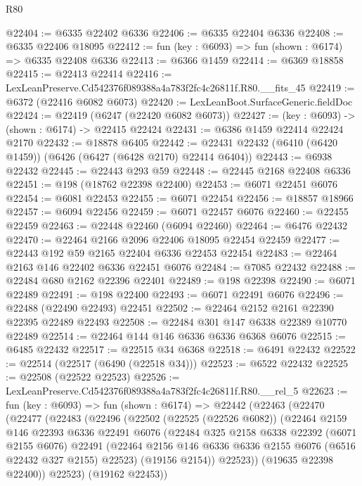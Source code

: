 \begin{lexlean}{R80}
\begin{coremodule}
@22404 := @6335 @22402 @6336
@22406 := @6335 @22404 @6336
@22408 := @6335 @22406 @18095
@22412 := fun (key : @6093) => fun (shown : @6174) => @6335 @22408 @6336
@22413 := @6366 @1459
@22414 := @6369 @18858
@22415 := @22413 @22414
@22416 := LexLeanPreserve.Cd542376f089388a4a783f2fc4c26811f.R80.__fits_45
@22419 := @6372 (@22416 @6082 @6073)
@22420 := LexLeanBoot.SurfaceGeneric.fieldDoc
@22424 := @22419 (@6247 (@22420 @6082 @6073))
@22427 := (key : @6093) -> (shown : @6174) -> @22415 @22424
@22431 := @6386 @1459 @22414 @22424 @2170
@22432 := @18878 @6405
@22442 := @22431 @22432 (@6410 (@6420 @1459)) (@6426 (@6427 (@6428 @2170) @22414 @6404))
@22443 := @6938 @22432
@22445 := @22443 @293 @59
@22448 := @22445 @2168 @22408 @6336
@22451 := @198 (@18762 @22398 @22400)
@22453 := @6071 @22451 @6076
@22454 := @6081 @22453
@22455 := @6071 @22454
@22456 := @18857 @18966
@22457 := @6094 @22456
@22459 := @6071 @22457 @6076
@22460 := @22455 @22459
@22463 := @22448 @22460 (@6094 @22460)
@22464 := @6476 @22432
@22470 := @22464 @2166 @2096 @22406 @18095 @22454 @22459
@22477 := @22443 @192 @59 @2165 @22404 @6336 @22453 @22454
@22483 := @22464 @2163 @146 @22402 @6336 @22451 @6076
@22484 := @7085 @22432
@22488 := @22484 @680 @2162 @22396 @22401
@22489 := @198 @22398
@22490 := @6071 @22489
@22491 := @198 @22400
@22493 := @6071 @22491 @6076
@22496 := @22488 (@22490 @22493) @22451
@22502 := @22464 @2152 @2161 @22390 @22395 @22489 @22493
@22508 := @22484 @301 @147 @6338 @22389 @10770 @22489
@22514 := @22464 @144 @146 @6336 @6336 @6368 @6076
@22515 := @6485 @22432
@22517 := @22515 @34 @6368
@22518 := @6491 @22432
@22522 := @22514 (@22517 (@6490 (@22518 @34)))
@22523 := @6522 @22432
@22525 := @22508 (@22522 @22523)
@22526 := LexLeanPreserve.Cd542376f089388a4a783f2fc4c26811f.R80.__rel_5
@22623 := fun (key : @6093) =>
  fun (shown : @6174) =>
  @22442
    (@22463
      (@22470
        (@22477
          (@22483
            (@22496
              (@22502
                (@22525 (@22526 @6082))
                (@22464
                  @2159
                  @146
                  @22393
                  @6336
                  @22491
                  @6076
                  (@22484
                    @325
                    @2158
                    @6338
                    @22392
                    (@6071 @2155 @6076)
                    @22491
                    (@22464 @2156 @146 @6336 @6336 @2155 @6076 (@6516 @22432 @327 @2155) @22523)
                    (@19156 @2154))
                  @22523))
              (@19635 @22398 @22400))
            @22523)
          (@19162 @22453))

\end{coremodule}
\end{lexlean}
